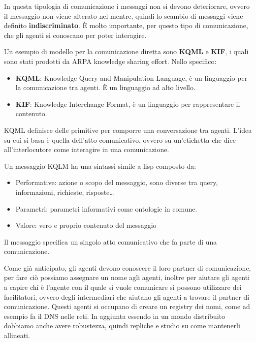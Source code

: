 In questa tipologia di comunicazione i messaggi non si devono deteriorare, ovvero
il messaggio non viene alterato nel mentre, quindi lo scambio di messaggi viene
definito \textbf{indiscriminato}. È molto importante, per questo tipo di
comunicazione, che gli agenti si conoscano per poter interagire.
\begin{esempio}
    Un esempio di modello per la comunicazione diretta sono \textbf{KQML} e
    \textbf{KIF}, i quali sono stati prodotti da ARPA knowledge sharing effort.
    Nello specifico:
    \begin{itemize}
        \item \textbf{KQML}: Knowledge Query and Manipulation Language, è un
              linguaggio per la comunicazione tra agenti. È un linguaggio ad
              alto livello.
        \item \textbf{KIF}: Knowledge Interchange Format, è un linguaggio per
              rappresentare il contenuto.
    \end{itemize}

    KQML definisce delle primitive per comporre una conversazione tra agenti.
    L'idea su cui si basa è quella dell'atto comunicativo, ovvero su un'etichetta
    che dice all'interlocutore come interagire in una comunicazione.

    Un messaggio KQLM ha una sintassi simile a lisp composto da:
    \begin{itemize}
        \item Performative: azione o scopo del messaggio, sono diverse tra query,
              informazioni, richieste, risposte\dots
        \item Parametri: parametri informativi come ontologie in comune.
        \item Valore: vero e proprio contenuto del messaggio
    \end{itemize}
    Il messaggio specifica un singolo atto comunicativo che fa parte di una comunicazione.
\end{esempio}

Come già anticipato, gli agenti devono conoscere il loro partner di comunicazione,
per fare ciò possiamo assegnare un nome agli agenti, inoltre per aiutare gli
agenti a capire chi è l'agente con il quale si vuole comunicare si possono
utilizzare dei facilitatori, ovvero degli intermediari che aiutano gli agenti
a trovare il partner di comunicazione. Questi agenti si occupano di creare un
registry dei nomi, come ad esempio fa il DNS nelle reti. In aggiunta essendo in
un mondo distribuito dobbiamo anche avere robustezza, quindi repliche e studio
su come mantenerli allineati.

